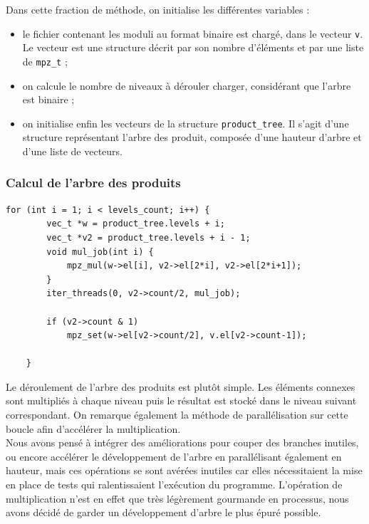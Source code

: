 Dans cette fraction de méthode, on initialise les différentes variables :
\begin{itemize}
	\item le fichier contenant les moduli au format binaire est chargé, dans le vecteur \texttt{v}. Le vecteur est une structure décrit par son nombre d'éléments et par une liste de \texttt{mpz\_t} ;
	\item on calcule le nombre de niveaux à dérouler charger, considérant que l'arbre est binaire ;
	\item on initialise enfin les vecteurs de la structure \texttt{product\_tree}. Il s'agit d'une structure représentant  l'arbre des produit, composée d'une hauteur d'arbre et d'une liste de vecteurs.
\end{itemize}



\subsubsection{Calcul de l'arbre des produits}

\begin{lstlisting}[style=customc,caption=fact\_superspeed.c - partie 2, label=fact2]
	for (int i = 1; i < levels_count; i++) {
		vec_t *w = product_tree.levels + i;
		vec_t *v2 = product_tree.levels + i - 1;
		void mul_job(int i) {
			mpz_mul(w->el[i], v2->el[2*i], v2->el[2*i+1]);
		}
		iter_threads(0, v2->count/2, mul_job);

		if (v2->count & 1)
			mpz_set(w->el[v2->count/2], v.el[v2->count-1]); 

	}
\end{lstlisting}

Le déroulement de l'arbre des produits est plutôt simple. Les éléments connexes sont multipliés à chaque niveau puis le résultat est stocké dans le niveau suivant correspondant. On remarque également la méthode de parallélisation sur cette boucle afin d'accélérer la multiplication.\\

Nous avons pensé à intégrer des améliorations pour couper des branches inutiles, ou encore accélérer le développement de l'arbre en parallélisant également en hauteur, mais ces opérations se sont avérées inutiles car elles nécessitaient la mise en place de tests qui ralentissaient l'exécution du programme. L'opération de multiplication n'est en effet que très légèrement gourmande en processus, nous avons décidé de garder un développement d'arbre le plus épuré possible.\\




